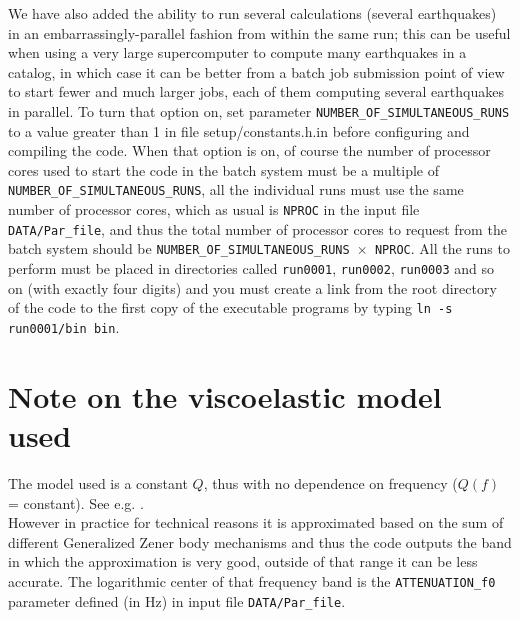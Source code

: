 We have also added the ability to run several calculations (several earthquakes)
in an embarrassingly-parallel fashion from within the same run;
this can be useful when using a very large supercomputer to compute
many earthquakes in a catalog, in which case it can be better from
a batch job submission point of view to start fewer and much larger jobs,
each of them computing several earthquakes in parallel.
To turn that option on, set parameter \texttt{NUMBER\_OF\_SIMULTANEOUS\_RUNS}
to a value greater than 1 in file setup/constants.h.in before
configuring and compiling the code.
When that option is on, of course the number of processor cores used to start
the code in the batch system must be a multiple of \texttt{NUMBER\_OF\_SIMULTANEOUS\_RUNS},
all the individual runs must use the same number of processor cores,
which as usual is \texttt{NPROC} in the input file \texttt{DATA/Par\_file},
and thus the total number of processor cores to request from the batch system
should be \texttt{NUMBER\_OF\_SIMULTANEOUS\_RUNS $\times$ NPROC}.
All the runs to perform must be placed in directories called \texttt{run0001}, \texttt{run0002}, \texttt{run0003} and so on (with exactly four digits)
and you must create a link from the root directory of the code
to the first copy of the executable programs by typing \texttt{ln -s run0001/bin bin}.


\section{Note on the viscoelastic model used}

\noindent
The model used is a constant $Q$, thus with no dependence on frequency ($Q(f)$ = constant).
See e.g. \cite{BlKoChLoXi16}. \\

\noindent
However in practice for technical reasons it is approximated based on the sum of different Generalized Zener body mechanisms
and thus the code outputs the band in which the approximation is very good, outside of that range it can be less accurate.
The logarithmic center of that frequency band is the \texttt{ATTENUATION\_f0} parameter defined (in Hz) in input file \texttt{DATA/Par\_file}.

